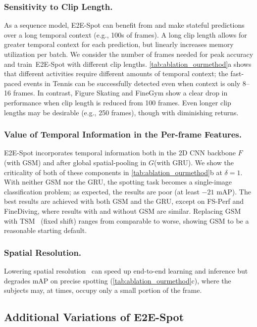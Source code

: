 \documentclass[runningheads]{llncs}
\newcommand{\notation}[1]{\ensuremath{#1}\xspace}
\newcommand{\OURMETHOD}{{E2E-Spot}\xspace}
\newcommand{\fsperf}{{FS-Perf}\xspace}
\newcommand{\finegym}{{FineGym}\xspace}
\newcommand{\finediving}{{FineDiving}\xspace}
\newcommand{\Tolerance}{\notation{\delta}}
\newcommand{\FeatureExtractor}{\notation{F}}
\newcommand{\TemporalArchitecture}{\notation{G}}
\begin{document}
\subsubsection*{Sensitivity to Clip Length.}
As a sequence model, \OURMETHOD can benefit from and make stateful predictions over a long temporal context (e.g., 100s of frames).
A long clip length allows for greater temporal context
for each prediction, but linearly increases memory utilization per batch.
We consider the number of frames needed for peak accuracy and train~\OURMETHOD with different clip lengths.
\autoref{tab:ablation_ourmethod}a shows that different activities require
different amounts of temporal context; the fast-paced events in Tennis can be
successfully detected even when context is only 8--16 frames.
In contrast, Figure Skating and \finegym show a clear drop in performance when clip length is reduced from 100 frames.
Even longer clip lengths may be desirable (e.g., 250 frames), though with diminishing returns.

\subsubsection*{Value of Temporal Information in the Per-frame Features.}
\OURMETHOD incorporates temporal information both in the 2D CNN backbone
\FeatureExtractor (with GSM) and after global spatial-pooling in
\TemporalArchitecture (with GRU).
We show the criticality of both of these components in
\autoref{tab:ablation_ourmethod}b at $\Tolerance=1$.
With neither GSM nor the GRU, the spotting task becomes a single-image
classification problem; as expected, the results are poor (at least $-21$ mAP).
The best results are achieved with both GSM and the GRU, except on \fsperf and \finediving, where results with and without GSM are similar.
Replacing GSM with TSM~\cite{tsm} (fixed shift) ranges from comparable to worse, showing GSM to be a reasonable starting default.


\subsubsection*{Spatial Resolution.}
Lowering spatial resolution~\cite{afsd,e2etad} can speed up end-to-end learning and inference but degrades mAP on precise spotting (\autoref{tab:ablation_ourmethod}c), where the subjects may, at times, occupy only a small portion of the frame.


\subsection{Additional Variations of \OURMETHOD}
\label{sub:variations}
\end{document}
